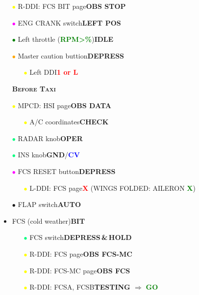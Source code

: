 \documentclass[a4paper,12pt,dvipsnames]{letter}
\newcommand{\button}[1]{\textbf{#1}}
\newcommand{\ok}[1]{\textcolor{Green}{\textbf{#1}}}
\newcommand{\boat}[1]{\textcolor{Blue}{\textbf{#1}}}
\newcommand{\warn}[1]{\textcolor{Red}{\textbf{#1}}}
\newcommand{\myHead}[1]{{\LARGE\textsc{\textbf{#1}}}}
\newcommand{\bi}{\textcolor{ProcessBlue}{$\bullet$\;}}
\newcommand{\gi}{\textcolor{Green}{$\bullet$\;}}
\newcommand{\yi}{\textcolor{Yellow}{$\bullet$\;}}
\newcommand{\mi}{\textcolor{Magenta}{$\bullet$\;}}
\newcommand{\oi}{\textcolor{Orange}{$\bullet$\;}}
\newcommand{\si}{\textcolor{SpringGreen}{$\bullet$\;}}
\begin{document}
{\begin{itemize}
 \begin{itemize}
  \item[\yi] L-DDI: FCS page\dotfill\warn{2 or R}
 \end{itemize}
 \item[\yi] R-DDI: FCS BIT page\dotfill\button{OBS STOP}
 \item[\mi] ENG CRANK switch\dotfill\button{LEFT POS}
 \item[\gi] Left throttle (\ok{RPM\;>\%})\dotfill\button{IDLE}
 \item[\oi] Master caution buttion\dotfill\button{DEPRESS}
 \begin{itemize}
  \item[\yi] Left DDI\dotfill\warn{1 or L}
 \end{itemize} 
\end{itemize}
\vspace{0.5em}
\begin{itemize}
 \item[] \myHead{Before Taxi}
 \item[\yi] MPCD: HSI page\dotfill\button{OBS DATA}
 \begin{itemize}
  \item[\yi] A/C coordinates\dotfill\button{CHECK}
 \end{itemize} 
 \item[\si] RADAR knob\dotfill\button{OPER}
 \item[\si] INS knob\dotfill\button{GND}/\boat{CV}
 \item[\mi] FCS RESET button\dotfill\button{DEPRESS}
 \begin{itemize}
  \item[\yi] L-DDI: FCS page\dotfill\warn{X} (WINGS FOLDED: AILERON \ok{X})
 \end{itemize}
 \item[\bi] FLAP switch\dotfill\button{AUTO}
 \item FCS (cold weather)\dotfill\button{BIT}
 \begin{itemize}
  \item[\si] FCS switch\dotfill\button{DEPRESS\,\&\,HOLD}
  \item[\yi] R-DDI: FCS page\dotfill\button{OBS FCS-MC}
  \item[\yi] R-DDI: FCS-MC page\dotfill\button{OBS FCS}
  \item[\yi] R-DDI: FCSA, FCSB\dotfill\button{TESTING $\Rightarrow$ }\ok{GO}

\end{itemize}
\end{itemize}}
\end{document}
